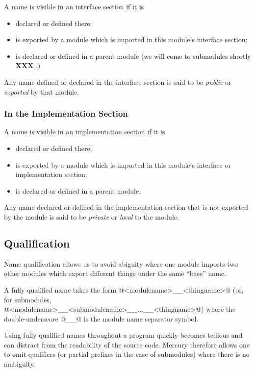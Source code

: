 \documentclass[a4paper,11pt,notitlepage,onecolumn]{article}
\newcommand{\XXX}[1]%
{{\small\textbf{XXX} \emph{#1}}}
\begin{document}
A name is visible in an interface section if it is
\begin{itemize}
\item declared or defined there;
\item is exported by a module which is imported in this
  module's interface section;
\item is declared or defined in a parent module (we will come
  to submodules shortly \XXX{}.)
\end{itemize}

Any name defined or declared in the interface section is
said to be \emph{public} or \emph{exported} by that module.

\subsubsection{In the Implementation Section}

A name is visible in an implementation section if it is
\begin{itemize}
\item declared or defined there;
\item is exported by a module which is imported in this
  module's interface or implementation section;
\item is declared or defined in a parent module.
\end{itemize}

Any name declared or defined in the implementation section
that is not exported by the module is said to be \emph{private}
or \emph{local} to the module.

\subsection{Qualification}

Name qualification allows us to avoid abiguity where one
module imports two other modules which export different things
under the same ``base'' name.

A fully qualified name takes the form @<modulename>__<thingname>@
(or, for submodules, @<modulename>__<submodulename>__...__<thingname>@)
where the double-underscore @__@ is the module name separator symbol.

Using fully qualified names throughout a program quickly
becomes tedious and can distract from the readability of the
source code.  Mercury therefore allows one to omit qualifiers
(or partial prefixes in the case of submodules) where there is
no ambiguity.
\end{document}
